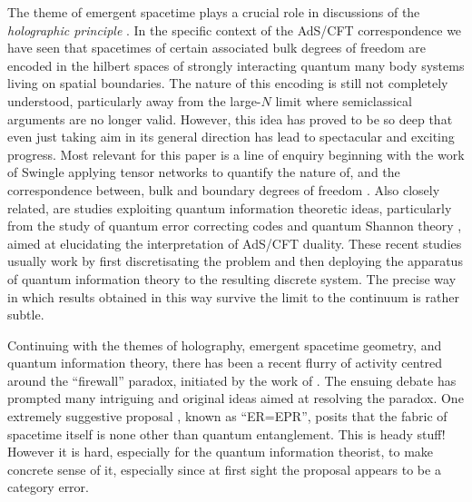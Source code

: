 \documentclass[11pt]{amsart}
\theoremstyle{plain}%
\theoremstyle{definition}
\theoremstyle{remark}
\begin{document}
The theme of emergent spacetime plays a crucial role in discussions of the \emph{holographic principle} \cite{bousso_holographic_2002}. In the specific context of the AdS/CFT correspondence \cite{maldacena_large_1999} we have seen that spacetimes of certain associated bulk degrees of freedom are encoded in the hilbert spaces of strongly interacting quantum many body systems living on spatial boundaries. The nature of this encoding is still not completely understood, particularly away from the large-$N$ limit where semiclassical arguments are no longer valid. However, this idea has proved to be so deep that even just taking aim in its general direction has lead to spectacular and exciting progress. Most relevant for this paper is a line of enquiry beginning with the work of Swingle \cite{swingle_entanglement_2012} applying tensor networks to quantify the nature of, and the correspondence between, bulk and boundary degrees of freedom \cite{nozaki_holographic_2012,ryu_aspects_2006,ryu_holographic_2006}. Also closely related, are studies exploiting quantum information theoretic ideas, particularly from the study of quantum error correcting codes \cite{almheiri_bulk_2014,pastawski_holographic_2015} and quantum Shannon theory \cite{czech_information_2014}, aimed at elucidating the interpretation of AdS/CFT duality. These recent studies usually work by first discretisating the problem and then deploying the apparatus of quantum information theory to the resulting discrete system. The precise way in which results obtained in this way survive the limit to the continuum is rather subtle.

Continuing with the themes of holography, emergent spacetime geometry, and quantum information theory, there has been a recent flurry of activity centred around the ``firewall'' paradox, initiated by the work of \cite{almheiri_black_2013}. The ensuing debate has prompted many intriguing and original ideas aimed at resolving the paradox. One extremely suggestive proposal \cite{maldacena_cool_2013}, known as ``ER=EPR'', posits that the fabric of spacetime itself is none other than quantum entanglement. This is heady stuff! However it is hard, especially for the quantum information theorist, to make concrete sense of it, especially since at first sight the proposal appears to be a category error. 
\end{document}
